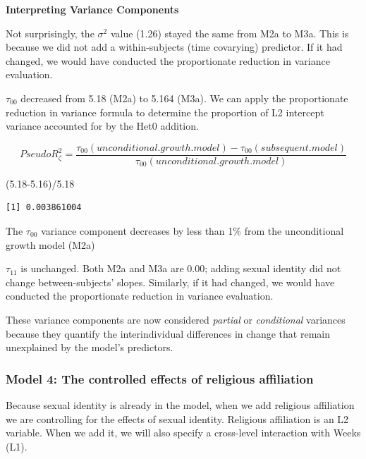 \documentclass[
  english,
]{book}
\newenvironment{Shaded}{\begin{snugshade}}{\end{snugshade}}
\newcommand{\FloatTok}[1]{\textcolor[rgb]{0.00,0.00,0.81}{#1}}
\newcommand{\NormalTok}[1]{#1}
\newcommand{\SpecialCharTok}[1]{\textcolor[rgb]{0.00,0.00,0.00}{#1}}
\begin{document}
\textbf{Interpreting Variance Components}

Not surprisingly, the \(\sigma ^{2}\) value (1.26) stayed the same from M2a to M3a. This is because we did not add a within-subjects (time covarying) predictor. If it had changed, we would have conducted the proportionate reduction in variance evaluation.

\(\tau _{00}\) decreased from 5.18 (M2a) to 5.164 (M3a). We can apply the proportionate reduction in variance formula to determine the proportion of L2 intercept variance accounted for by the Het0 addition.

\[Pseudo R_{\zeta }^{2} = \frac{\tau _{00} (unconditional. growth. model) - \tau _{00}(subsequent. model)}{\tau _{00}(unconditional. growth. model)}\]

\begin{Shaded}
\begin{Highlighting}[]
\NormalTok{(}\FloatTok{5.18{-}5.16}\NormalTok{)}\SpecialCharTok{/}\FloatTok{5.18}
\end{Highlighting}
\end{Shaded}

\begin{verbatim}
[1] 0.003861004
\end{verbatim}

The \(\tau _{00}\) variance component decreases by less than 1\% from the unconditional growth model (M2a)

\(\tau _{11}\) is unchanged. Both M2a and M3a are 0.00; adding sexual identity did not change between-subjects' slopes. Similarly, if it had changed, we would have conducted the proportionate reduction in variance evaluation.

These variance components are now considered \emph{partial} or \emph{conditional} variances because they quantify the interindividual differences in change that remain unexplained by the model's predictors.

\hypertarget{model-4-the-controlled-effects-of-religious-affiliation}{%
\subsubsection{Model 4: The controlled effects of religious affiliation}\label{model-4-the-controlled-effects-of-religious-affiliation}}

Because sexual identity is already in the model, when we add religious affiliation we are controlling for the effects of sexual identity. Religious affiliation is an L2 variable. When we add it, we will also specify a cross-level interaction with Weeks (L1).
\end{document}
